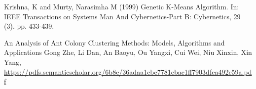 \documentclass[10pt]{article}
\begin{document}
\begin{thebibliography}{9}
Krishna, K and Murty, Narasimha M (1999) Genetic K-Means Algorithm. In: IEEE Transactions on Systems Man And Cybernetics-Part B: Cybernetics, 29 (3). pp. 433-439.

An Analysis of Ant Colony Clustering Methods: Models, Algorithms and Applications Gong Zhe, Li Dan, An Baoyu, Ou Yangxi, Cui Wei, Niu Xinxin, Xin Yang, \url{https://pdfs.semanticscholar.org/6b8e/36adaa1cbe7781ebac1ff7903dfea492c59a.pdf}
\end{thebibliography}
\end{document}
